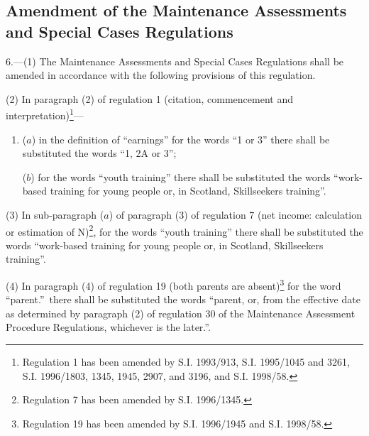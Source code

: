 \documentclass[12pt,a4paper]{article}
\begin{document}
\subsection[6. Amendment of the Maintenance Assessments and Special Cases Regulations]{Amendment of the Maintenance Assessments and Special Cases Regulations}

6.—(1) The Maintenance Assessments and Special Cases Regulations shall be amended in accordance with the following provisions of this regulation.

(2) In paragraph (2) of regulation 1 (citation, commencement and interpretation)\footnote{\frenchspacing Regulation 1 has been amended by S.I. 1993/913, S.I. 1995/1045 and 3261, S.I. 1996/1803, 1345, 1945, 2907, and 3196, and S.I. 1998/58.}—
\begin{enumerate}\item[]
($a$) in the definition of “earnings” for the words “1 or 3” there shall be substituted the words “1, 2A or 3”;

($b$) for the words “youth training” there shall be substituted the words “work-based training for young people or, in Scotland, Skillseekers training”.
\end{enumerate}

(3) In sub-paragraph ($a$) of paragraph (3) of regulation 7 (net income: calculation or estimation of N)\footnote{\frenchspacing Regulation 7 has been amended by S.I. 1996/1345.}, for the words “youth training” there shall be substituted the words “work-based training for young people or, in Scotland, Skillseekers training”.

(4) In paragraph (4) of regulation 19 (both parents are absent)\footnote{\frenchspacing Regulation 19 has been amended by S.I. 1996/1945 and S.I. 1998/58.} for the word “parent.”\ there shall be substituted the words “parent, or, from the effective date as determined by paragraph (2) of regulation 30 of the Maintenance Assessment Procedure Regulations, whichever is the later.”.
\end{document}

